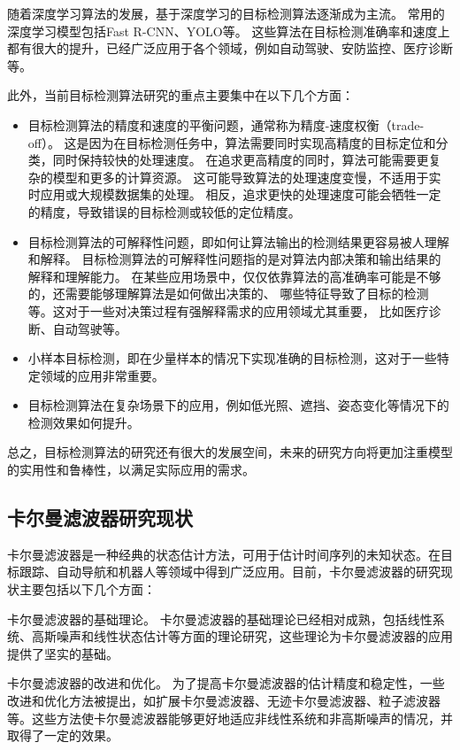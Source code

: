随着深度学习算法的发展，基于深度学习的目标检测算法逐渐成为主流。
常用的深度学习模型包括Fast R-CNN\cite{girshick2015fast}、YOLO\cite{jiang2022review}等。
这些算法在目标检测准确率和速度上都有很大的提升，已经广泛应用于各个领域，例如自动驾驶、安防监控、医疗诊断等。
\par
此外，当前目标检测算法研究的重点主要集中在以下几个方面：
\begin{itemize}[itemindent=2em]
    \item 目标检测算法的精度和速度的平衡问题，通常称为精度-速度权衡（trade-off）。
    这是因为在目标检测任务中，算法需要同时实现高精度的目标定位和分类，同时保持较快的处理速度。
    在追求更高精度的同时，算法可能需要更复杂的模型和更多的计算资源。
    这可能导致算法的处理速度变慢，不适用于实时应用或大规模数据集的处理。
    相反，追求更快的处理速度可能会牺牲一定的精度，导致错误的目标检测或较低的定位精度。
    
    \item 目标检测算法的可解释性问题，即如何让算法输出的检测结果更容易被人理解和解释。
    目标检测算法的可解释性问题指的是对算法内部决策和输出结果的解释和理解能力。
    在某些应用场景中，仅仅依靠算法的高准确率可能是不够的，还需要能够理解算法是如何做出决策的、
    哪些特征导致了目标的检测等。这对于一些对决策过程有强解释需求的应用领域尤其重要，
    比如医疗诊断、自动驾驶等。
    
    \item 小样本目标检测，即在少量样本的情况下实现准确的目标检测，这对于一些特定领域的应用非常重要。
    
    \item 目标检测算法在复杂场景下的应用，例如低光照、遮挡、姿态变化等情况下的检测效果如何提升。
    
\end{itemize}


总之，目标检测算法的研究还有很大的发展空间，未来的研究方向将更加注重模型的实用性和鲁棒性，以满足实际应用的需求。

\subsection{卡尔曼滤波器研究现状}
卡尔曼滤波器是一种经典的状态估计方法，可用于估计时间序列的未知状态。在目标跟踪、自动导航和机器人等领域中得到广泛应用。目前，卡尔曼滤波器的研究现状主要包括以下几个方面：
\par
卡尔曼滤波器的基础理论。
卡尔曼滤波器的基础理论已经相对成熟，包括线性系统、高斯噪声和线性状态估计等方面的理论研究，这些理论为卡尔曼滤波器的应用提供了坚实的基础。
\par
卡尔曼滤波器的改进和优化。
为了提高卡尔曼滤波器的估计精度和稳定性，一些改进和优化方法被提出，如扩展卡尔曼滤波器\cite{ribeiro2004kalman}、无迹卡尔曼滤波器\cite{wan2000unscented}、粒子滤波器\cite{gustafsson2010particle}等。这些方法使卡尔曼滤波器能够更好地适应非线性系统和非高斯噪声的情况，并取得了一定的效果。

